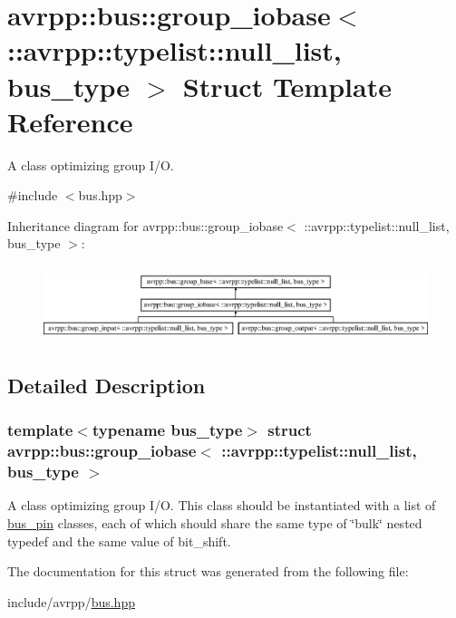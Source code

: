 \hypertarget{structavrpp_1_1bus_1_1group__iobase_3_01_1_1avrpp_1_1typelist_1_1null__list_00_01bus__type_01_4}{
\section{avrpp::bus::group\_\-iobase$<$ ::avrpp::typelist::null\_\-list, bus\_\-type $>$ Struct Template Reference}
\label{structavrpp_1_1bus_1_1group__iobase_3_01_1_1avrpp_1_1typelist_1_1null__list_00_01bus__type_01_4}
}


A class optimizing group I/O.  




{\ttfamily \#include $<$bus.hpp$>$}

Inheritance diagram for avrpp::bus::group\_\-iobase$<$ ::avrpp::typelist::null\_\-list, bus\_\-type $>$:\begin{figure}[H]
\begin{center}
\leavevmode
\includegraphics[height=2.222222cm]{structavrpp_1_1bus_1_1group__iobase_3_01_1_1avrpp_1_1typelist_1_1null__list_00_01bus__type_01_4}
\end{center}
\end{figure}


\subsection{Detailed Description}
\subsubsection*{template$<$typename bus\_\-type$>$ struct avrpp::bus::group\_\-iobase$<$ ::avrpp::typelist::null\_\-list, bus\_\-type $>$}

A class optimizing group I/O. This class should be instantiated with a list of \hyperlink{structavrpp_1_1bus_1_1bus__pin}{bus\_\-pin} classes, each of which should share the same type of \char`\"{}bulk\char`\"{} nested typedef and the same value of bit\_\-shift. 

The documentation for this struct was generated from the following file:\begin{DoxyCompactItemize}
\item 
include/avrpp/\hyperlink{bus_8hpp}{bus.hpp}\end{DoxyCompactItemize}
